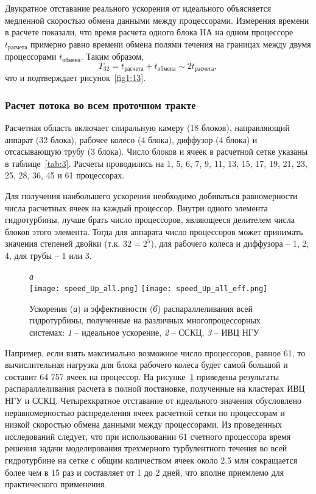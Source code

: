 Двукратное отставание реального ускорения от идеального объясняется медленной скоростью обмена данными между
процессорами. Измерения времени в расчете показали, что время расчета одного блока НА на одном 
процессоре $t_\text{расчета}$ примерно равно времени обмена полями течения на границах между двумя 
процессорами $t_\text{обмена}$. Таким образом, 
\begin{equation}
  T_{32} = t_\text{расчета} + t_\text{обмена} \sim 2 t_\text{расчета},
\end{equation}
что и подтверждает рисунок~\ref{fig1:13}.

\subsubsection{Расчет потока во всем проточном тракте}
\label{s:1634}
Расчетная область включает спиральную камеру (18 блоков), направляющий аппарат (32 блока), рабочее колесо 
(4 блока), диффузор (4 блока) и отсасывающую трубу (3 блока). 
Число блоков и ячеек в расчетной сетке указаны в таблице~\ref{tab:3}.
Расчеты проводились на 1, 5, 6, 7, 9, 11, 13, 15, 17, 19, 21, 23, 25, 28, 36, 45 и 61 процессорах. 

Для получения наибольшего ускорения необходимо добиваться равномерности числа расчетных ячеек на каждый 
процессор. Внутри одного элемента гидротурбины, лучше брать число процессоров, являющееся делителем числа 
блоков этого элемента. Тогда для аппарата число процессоров может принимать значения степеней двойки (т.к. 
$32=2^5$), для рабочего колеса и диффузора -- 1, 2, 4, для трубы -- 1 или 3. 

\begin{figure}[ht]
  \label{fig1:14}
  \centering\small{\it а}\hspace*{90mm}{\it б}\\
  {\texttt{[image: speed\_Up\_all.png]}}\hfill
  {\texttt{[image: speed\_Up\_all\_eff.png]}}
  \caption{Ускорения (\emph{а}) и эффективности (\emph{б}) распараллеливания всей гидротурбины, 
           полученные на различных многопроцессорных системах: \emph{1} -- идеальное ускорение, 
           \emph{2} -- ССКЦ, \emph{3} -- ИВЦ НГУ}
\end{figure}

Например, если взять максимально возможное число процессоров, равное 61, то вычислительная нагрузка для блока
рабочего колеса будет самой большой и составит 64 757 ячеек на процессор. На рисунке~\ref{fig1:14} 
приведены результаты распараллеливания расчета в полной постановке, полученные на кластерах ИВЦ НГУ и ССКЦ. 
Четырехкратное отставание от идеального значения обусловлено неравномерностью распределения ячеек расчетной 
сетки по процессорам и низкой скоростью обмена данными между процессорами. Из проведенных исследований 
следует, что при использовании 61 счетного процессора время решения задачи моделирования трехмерного 
турбулентного течения во всей гидротурбине на сетке с общим количеством ячеек около 2.5 млн сокращается более 
чем в 15 раз и составляет от 1 до 2 дней, что вполне приемлемо для практического применения.
